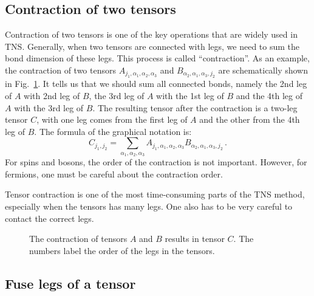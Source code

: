 \documentclass[preprint,3p,times,preprint,showpacs,amsmath,superscriptaddress,floatfix]{elsarticle}
\begin{document}
\subsection{Contraction of two tensors}

Contraction of two tensors is one of the key operations that are widely used in TNS.
Generally, when two tensors are connected with legs, we need to sum the bond dimension of these legs. This process is called ``contraction''.
As an example, the contraction of two tensors $A_{j_1,\alpha_1,\alpha_2,\alpha_3}$ and $B_{\alpha_2,\alpha_1,\alpha_3,j_2}$ are schematically
shown in Fig.~\ref{contractpic}. It tells us that we should sum all connected bonds, namely the 2nd leg of $A$ with 2nd leg of $B$, the 3rd leg of $A$ with the 1st leg of $B$ and the 4th leg of $A$ with the 3rd leg of $B$. The resulting tensor after the contraction
is a two-leg tensor $C$, with one leg comes from the first leg of $A$ and the other from the 4th leg of $B$.
The formula of the  graphical notation is:
%
\begin{equation}\label{contract}
C_{j_1,j_2}=\sum_{\alpha_1,\alpha_2,\alpha_3}A_{j_1,\alpha_1,\alpha_2,\alpha_3}B_{\alpha_2,\alpha_1,\alpha_3,j_2}\, .
\end{equation}
For spins and bosons, the order of the contraction is not important. However, for fermions, one must be careful about the contraction order.

Tensor contraction is one of the most time-consuming parts of the TNS method, especially when the tensors has many legs. One also has to be very careful to contact the correct legs.

	
\begin{figure} [!hbp]
		\begin{center}
		\caption{The contraction of tensors $A$ and $B$ results in tensor $C$.
The numbers label the order of the legs in the tensors.}\label{contractpic}
		\end{center}
\end{figure}

\subsection{Fuse legs of a tensor}
\end{document}
